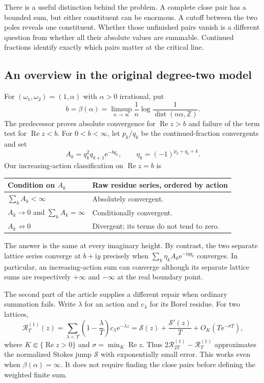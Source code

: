 \documentclass[11pt,a4paper]{article}
\numberwithin{equation}{section}
\theoremstyle{definition}
\theoremstyle{remark}
\newcommand{\Z}{\mathbb Z}
\newcommand{\e}{\mathrm e}
\newcommand{\ii}{\mathrm i}
\newcommand{\re}{\operatorname{Re}}
\newcommand{\dist}{\operatorname{dist}}
\newcommand{\Ssum}{\mathcal S}
\newcommand{\Riesz}{\mathcal R}
\begin{document}
There is a useful distinction behind the problem. A complete close pair
has a bounded sum, but either constituent can be enormous. A cutoff
between the two poles reveals one constituent. Whether those unfinished
pairs vanish is a different question from whether all their absolute
values are summable. Continued fractions identify exactly which pairs
matter at the critical line.

\subsection{An overview in the original degree-two model}
For $(\omega_1,\omega_2)=(1,\alpha)$ with $\alpha>0$ irrational, put
\begin{equation}
 b=\beta(\alpha)=\limsup_{n\to\infty}\frac{1}{n}
                  \log\frac{1}{\dist(n\alpha,\Z)}.
 \label{eq:intro-beta}
\end{equation}
The predecessor proves absolute convergence for $\re z>b$ and failure of
the term test for $\re z<b$. For $0<b<\infty$, let $p_k/q_k$ be the
continued-fraction convergents and set
\begin{equation}
 A_k=q_k^2q_{k+1}\e^{-bq_k},\qquad
 \eta_k=(-1)^{p_k+q_k+k}.
 \label{eq:intro-amplitudes}
\end{equation}
Our increasing-action classification on $\re z=b$ is
\begin{center}
\begin{tabular}{p{}p{}}
\toprule
Condition on $A_k$ & Raw residue series, ordered by action\\
\midrule
$\sum_k A_k<\infty$ & Absolutely convergent.\\
$A_k\to0$ and $\sum_k A_k=\infty$ & Conditionally convergent.\\
$A_k\not\to0$ & Divergent; its terms do not tend to zero.\\
\bottomrule
\end{tabular}
\end{center}
The answer is the same at every imaginary height. By contrast, the two
separate lattice series converge at $b+\ii y$ precisely when
$\sum_k\eta_k A_k\e^{-\ii yq_k}$ converges. In particular, an
increasing-action sum can converge although its separate lattice sums
are respectively $+\infty$ and $-\infty$ at the real boundary point.

The second part of the article supplies a different repair when ordinary
summation fails. Write $\lambda$ for an action and $c_\lambda$ for its
Borel residue. For two lattices,
\begin{equation}
 \Riesz_T^{(1)}(z)
 =\sum_{\lambda<T}\left(1-\frac{\lambda}{T}\right)c_\lambda\e^{-\lambda z}
 =\Ssum(z)+\frac{\Ssum'(z)}{T}+O_K(T\e^{-\sigma T}),
 \label{eq:intro-riesz}
\end{equation}
where $K\Subset\{\re z>0\}$ and $\sigma=\min_K\re z$. Thus
$2\Riesz_{2T}^{(1)}-\Riesz_T^{(1)}$ approximates the normalized Stokes
jump $\Ssum$ with exponentially small error. This works even when
$\beta(\alpha)=\infty$. It does not require finding the close pairs
before defining the weighted finite sum.
\end{document}
